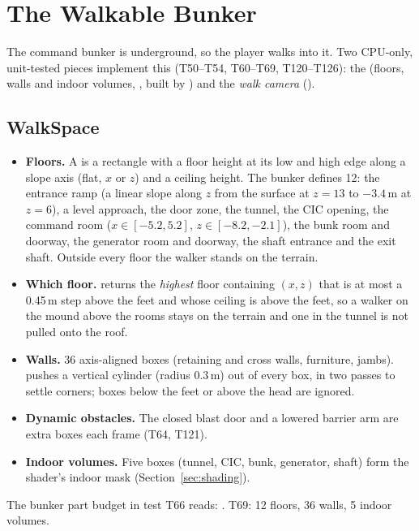 \section{The Walkable Bunker}\label{sec:walk}
The command bunker is underground, so the player walks into it. Two CPU-only, unit-tested pieces implement this (T50--T54, T60--T69, T120--T126): the 
(floors, walls and indoor volumes, , built by ) and the \emph{walk camera} ().

\subsection{WalkSpace}
\begin{itemize}
  \item \textbf{Floors.} A  is a rectangle with a floor height at its low and high edge along a slope axis (flat, $x$ or $z$) and a ceiling
  height. The bunker defines 12: the entrance ramp (a linear slope along $z$ from the surface at $z=13$ to $-3.4$\,m at $z=6$), a level
  approach, the door zone, the tunnel, the CIC opening, the command room ($x\in[-5.2,5.2]$, $z\in[-8.2,-2.1]$), the bunk room and doorway, the generator room and doorway, the shaft entrance and the exit shaft.
  Outside every floor the walker stands on the terrain.
  \item \textbf{Which floor.}  returns the \emph{highest} floor containing $(x,z)$ that is at most a 0.45\,m step above the feet
  and whose ceiling is above the feet, so a walker on the mound above the rooms stays on the terrain and one in the tunnel is not pulled onto the roof.
  \item \textbf{Walls.} 36 axis-aligned boxes (retaining and cross walls, furniture, jambs).  pushes a vertical cylinder (radius 0.3\,m) out of every box, in two passes
  to settle corners; boxes below the feet or above the head are ignored.
  \item \textbf{Dynamic obstacles.} The closed blast door and a lowered barrier arm are extra boxes each frame (T64, T121).
  \item \textbf{Indoor volumes.} Five boxes (tunnel, CIC, bunk, generator, shaft) form the shader's indoor mask (Section~\ref{sec:shading}).
\end{itemize}
The bunker part budget in test T66 reads: \bunkerBudget. T69: 12 floors, 36 walls, 5 indoor volumes.

